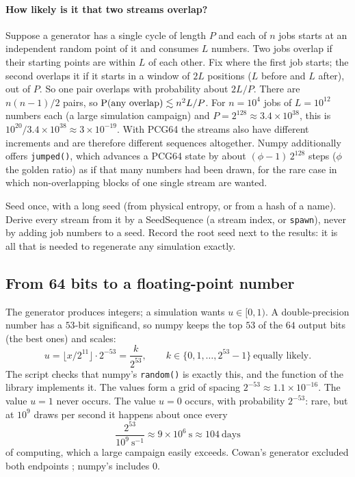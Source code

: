 \paragraph{How likely is it that two streams overlap?}
Suppose a generator has a single cycle of length $P$ and each of $n$ jobs starts
at an independent random point of it and consumes $L$ numbers. Two jobs overlap if
their starting points are within $L$ of each other. Fix where the first job
starts; the second overlaps it if it starts in a window of $2L$ positions ($L$
before and $L$ after), out of $P$. So one pair overlaps with probability about
$2L/P$. There are $n(n-1)/2$ pairs, so
$\operatorname{P}(\text{any overlap})\lesssim n^2L/P$. For $n=10^4$ jobs of $L=10^{12}$
numbers each (a large simulation campaign) and $P=2^{128}\approx3.4\times10^{38}$,
this is $10^{20}/3.4\times10^{38}\approx3\times10^{-19}$. With PCG64 the streams
also have different increments and are therefore different sequences altogether.
Numpy additionally offers \texttt{jumped()}, which advances a PCG64 state by
about $(\phi-1)\,2^{128}$ steps ($\phi$ the golden ratio) as if that many
numbers had been drawn, for the rare case in which non-overlapping blocks of one
single stream are wanted.

\begin{keyidea}
Seed once, with a long seed (from physical entropy, or from a hash of a name).
Derive every stream from it by a SeedSequence (a stream index, or
\texttt{spawn}), never by adding job numbers to a seed. Record the root seed next
to the results: it is all that is needed to regenerate any simulation exactly.
\end{keyidea}

\subsection{From 64 bits to a floating-point number}

The generator produces integers; a simulation wants $u\in[0,1)$. A double-precision
number has a $53$-bit significand, so numpy keeps the top $53$ of the $64$ output
bits (the best ones) and scales:
\begin{equation}
  u=\bigl\lfloor x/2^{11}\bigr\rfloor\cdot2^{-53}=\frac k{2^{53}},\qquad
  k\in\{0,1,\dots,2^{53}-1\}\ \text{equally likely} .
  \label{6a:eq:double}
\end{equation}
The script checks that numpy's \texttt{random()} is exactly this, and the function
 of the library implements it. The values form a grid of spacing
$2^{-53}\approx1.1\times10^{-16}$. The value $u=1$ never occurs. The value $u=0$
occurs, with probability $2^{-53}$: rare, but at $10^9$ draws per second it happens
about once every
\[
  \frac{2^{53}}{10^9\ \text{s}^{-1}}\approx9\times10^{6}\ \text{s}\approx 104\ \text{days}
\]
of computing, which a large campaign easily exceeds. Cowan's generator excluded both
endpoints ; numpy's includes $0$.

